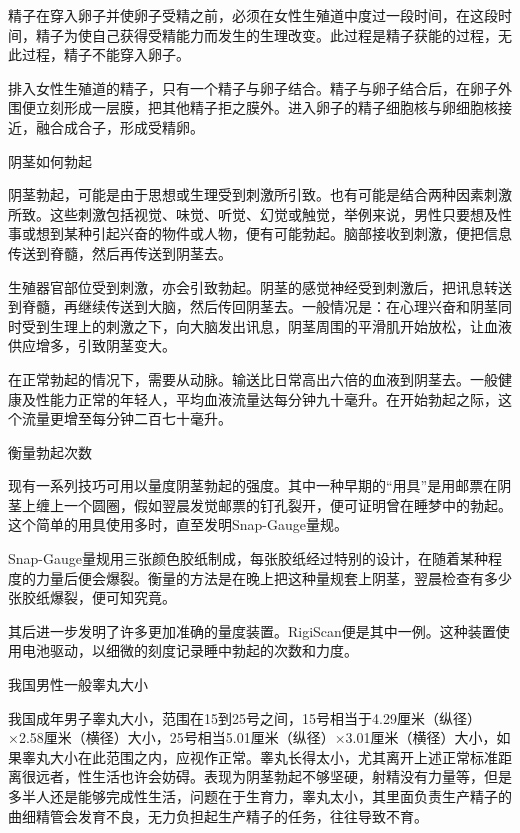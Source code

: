 \documentclass[12pt,UTF8,openany]{ctexbook}
\begin{document}
精子在穿入卵子并使卵子受精之前，必须在女性生殖道中度过一段时间，在这段时间，精子为使自己获得受精能力而发生的生理改变。此过程是精子获能的过程，无此过程，精子不能穿入卵子。

排入女性生殖道的精子，只有一个精子与卵子结合。精子与卵子结合后，在卵子外围便立刻形成一层膜，把其他精子拒之膜外。进入卵子的精子细胞核与卵细胞核接近，融合成合子，形成受精卵。





阴茎如何勃起


阴茎勃起，可能是由于思想或生理受到刺激所引致。也有可能是结合两种因素刺激所致。这些刺激包括视觉、味觉、听觉、幻觉或触觉，举例来说，男性只要想及性事或想到某种引起兴奋的物件或人物，便有可能勃起。脑部接收到刺激，便把信息传送到脊髓，然后再传送到阴茎去。

生殖器官部位受到刺激，亦会引致勃起。阴茎的感觉神经受到刺激后，把讯息转送到脊髓，再继续传送到大脑，然后传回阴茎去。一般情况是：在心理兴奋和阴茎同时受到生理上的刺激之下，向大脑发出讯息，阴茎周围的平滑肌开始放松，让血液供应增多，引致阴茎变大。

在正常勃起的情况下，需要从动脉。输送比日常高出六倍的血液到阴茎去。一般健康及性能力正常的年轻人，平均血液流量达每分钟九十毫升。在开始勃起之际，这个流量更增至每分钟二百七十毫升。





衡量勃起次数


现有一系列技巧可用以量度阴茎勃起的强度。其中一种早期的“用具”是用邮票在阴茎上缠上一个圆圈，假如翌晨发觉邮票的钉孔裂开，便可证明曾在睡梦中的勃起。这个简单的用具使用多时，直至发明Snap-Gauge量规。

Snap-Gauge量规用三张颜色胶纸制成，每张胶纸经过特别的设计，在随着某种程度的力量后便会爆裂。衡量的方法是在晚上把这种量规套上阴茎，翌晨检查有多少张胶纸爆裂，便可知究竟。

其后进一步发明了许多更加准确的量度装置。RigiScan便是其中一例。这种装置使用电池驱动，以细微的刻度记录睡中勃起的次数和力度。





我国男性一般睾丸大小


我国成年男子睾丸大小，范围在15到25号之间，15号相当于4.29厘米（纵径）×2.58厘米（横径）大小，25号相当5.01厘米（纵径）×3.01厘米（横径）大小，如果睾丸大小在此范围之内，应视作正常。睾丸长得太小，尤其离开上述正常标准距离很远者，性生活也许会妨碍。表现为阴茎勃起不够坚硬，射精没有力量等，但是多半人还是能够完成性生活，问题在于生育力，睾丸太小，其里面负责生产精子的曲细精管会发育不良，无力负担起生产精子的任务，往往导致不育。
\end{document}
